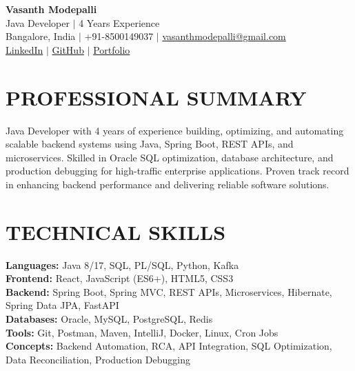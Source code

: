 \documentclass[a4paper,10pt]{article}
\begin{document}
\begin{center}
    {\Huge \textbf{Vasanth Modepalli}} \\ \vspace{2pt}
    Java Developer $|$ 4 Years Experience \\ \vspace{1pt}
    Bangalore, India $|$ +91-8500149037 $|$ \href{mailto:vasanthmodepalli@gmail.com}{vasanthmodepalli@gmail.com} \\ \vspace{2pt}
    \href{https://linkedin.com/in/}{LinkedIn} $|$ \href{https://github.com/}{GitHub} $|$ \href{https://portfolio.com/}{Portfolio}
\end{center}

\section*{PROFESSIONAL SUMMARY}
Java Developer with 4 years of experience building, optimizing, and automating scalable backend systems using Java, Spring Boot, REST APIs, and microservices. Skilled in Oracle SQL optimization, database architecture, and production debugging for high-traffic enterprise applications. Proven track record in enhancing backend performance and delivering reliable software solutions.

\section*{TECHNICAL SKILLS}
\textbf{Languages:} Java 8/17, SQL, PL/SQL, Python, Kafka \\
\textbf{Frontend:} React, JavaScript (ES6+), HTML5, CSS3 \\
\textbf{Backend:} Spring Boot, Spring MVC, REST APIs, Microservices, Hibernate, Spring Data JPA, FastAPI \\
\textbf{Databases:} Oracle, MySQL, PostgreSQL, Redis \\
\textbf{Tools:} Git, Postman, Maven, IntelliJ, Docker, Linux, Cron Jobs \\
\textbf{Concepts:} Backend Automation, RCA, API Integration, SQL Optimization, Data Reconciliation, Production Debugging
\end{document}
